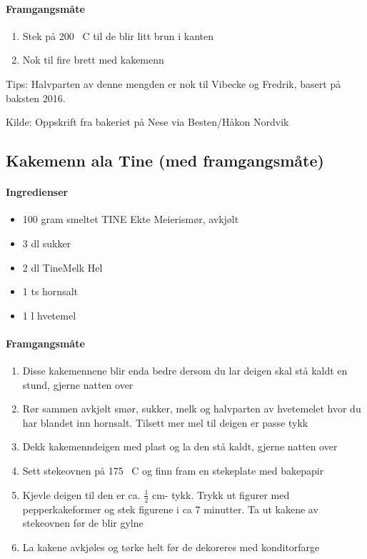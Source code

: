 \documentclass[12pt,a4paper]{book}
\begin{document}
{\paragraph{Framgangsmåte}
\begin{enumerate}[noitemsep]
	\item Stek på 200 \degree~C til de blir litt brun i kanten
	\item Nok til fire brett med kakemenn
\end{enumerate}

Tips: Halvparten av denne mengden er nok til Vibecke og Fredrik, basert på baksten 2016.

Kilde: Oppskrift fra bakeriet på Nese via Besten/Håkon Nordvik


\subsection{Kakemenn ala Tine (med framgangsmåte)}

\paragraph{Ingredienser}
\begin{itemize}[noitemsep]
	\item 100 gram smeltet TINE Ekte Meierismør, avkjølt
	\item 3 dl sukker
	\item 2 dl TineMelk Hel
	\item 1 ts hornsalt
	\item 1 l hvetemel
\end{itemize}

\paragraph{Framgangsmåte}
\begin{enumerate}[noitemsep]
	\item Disse kakemennene blir enda bedre dersom du lar deigen skal stå kaldt en stund, gjerne natten over
	\item Rør sammen avkjølt smør, sukker, melk og halvparten av hvetemelet hvor du har blandet inn hornsalt. Tilsett mer mel til deigen er passe tykk
	\item Dekk kakemenndeigen med plast og la den stå kaldt, gjerne natten over
	\item Sett stekeovnen på 175 \degree~C og finn fram en stekeplate med bakepapir
	\item Kjevle deigen til den er ca. $\frac{1}{2}$ cm- tykk. Trykk ut figurer med pepperkakeformer og stek figurene i ca 7 minutter. Ta ut kakene av stekeovnen før de blir gylne
	\item La kakene avkjøles og tørke helt før de dekoreres med konditorfarge
\end{enumerate}


}
\end{document}
